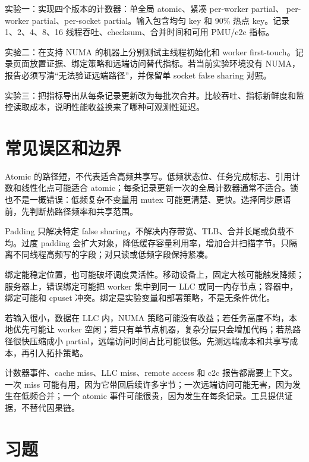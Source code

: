\begin{exercisebox}
实验一：实现四个版本的计数器：单全局 atomic、紧凑 per-worker partial、 per-worker partial、per-socket partial。输入包含均匀 key 和 90\% 热点 key。记录 1、2、4、8、16 线程吞吐、checksum、合并时间和可用 PMU/c2c 指标。

实验二：在支持 NUMA 的机器上分别测试主线程初始化和 worker first-touch。记录页面放置证据、绑定策略和远端访问替代指标。若当前实验环境没有 NUMA，报告必须写清“无法验证远端路径”，并保留单 socket false sharing 对照。

实验三：把指标导出从每条记录更新改为每批次合并。比较吞吐、指标新鲜度和监控读取成本，说明性能收益换来了哪种可观测性延迟。
\end{exercisebox}

\section{常见误区和边界}

Atomic 的路径短，不代表适合高频共享写。低频状态位、任务完成标志、引用计数和线性化点可能适合 atomic；每条记录更新一次的全局计数器通常不适合。锁也不是一概错误：低频复杂不变量用 mutex 可能更清楚、更快。选择同步原语前，先判断热路径频率和共享范围。

Padding 只解决特定 false sharing，不解决内存带宽、TLB、合并长尾或负载不均。过度 padding 会扩大对象，降低缓存容量利用率，增加合并扫描字节。只隔离不同线程高频写的字段；对只读或低频字段保持紧凑。

绑定能稳定位置，也可能破坏调度灵活性。移动设备上，固定大核可能触发降频；服务器上，错误绑定可能把 worker 集中到同一 LLC 或同一内存节点；容器中，绑定可能和 cpuset 冲突。绑定是实验变量和部署策略，不是无条件优化。

若输入很小，数据在 LLC 内，NUMA 策略可能没有收益；若任务高度不均，本地优先可能让 worker 空闲；若只有单节点机器，复杂分层只会增加代码；若热路径很快压缩成小 partial，远端访问时间占比可能很低。先测远端成本和共享写成本，再引入拓扑策略。

计数器事件、cache miss、LLC miss、remote access 和 c2c 报告都需要上下文。一次 miss 可能有用，因为它带回后续许多字节；一次远端访问可能无害，因为发生在低频合并；一个 atomic 事件可能很贵，因为发生在每条记录。工具提供证据，不替代因果链。

\section{习题}

